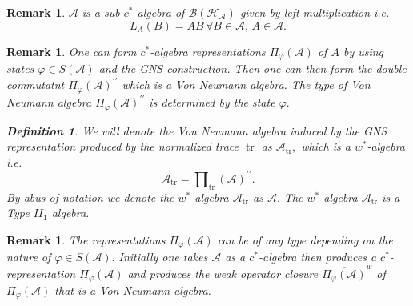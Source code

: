 \documentclass[aps,preprint]{revtex4}%
\newtheorem{definition}[theorem]{Definition}
\newtheorem{remark}[theorem]{Remark}
\begin{document}
\begin{remark}
$\mathcal{A}$ is a \emph{sub }$c^{\ast}$\emph{-algebra} of $\mathcal{B}\left(
\mathcal{H}_{\mathcal{A}}\right)  $ given by left multiplication i.e.
\begin{equation}
L_{A}\left(  B\right)  =AB\,\forall B\in\mathcal{A},\,A\in\mathcal{A}.
\end{equation}

\end{remark}

\begin{remark}
\emph{One can form }$c^{\ast}$\emph{-algebra representations }$\Pi_{\varphi
}\left(  \mathcal{A}\right)  $\emph{ of }$A$\emph{ by using states }%
$\varphi\in S\left(  \mathcal{A}\right)  $\emph{ and the GNS construction.
Then one can then form the double commutatnt }$\Pi_{\varphi}\left(
\mathcal{A}\right)  ^{\prime\prime}$\emph{ which is a Von Neumann algebra. The
type of Von Neumann algebra }$\Pi_{\varphi}\left(  \mathcal{A}\right)
^{\prime\prime}$\emph{ is determined by the state }$\varphi.$

\begin{definition}
We will denote the \emph{Von Neumann algebra induced by the }GNS
representation produced by the normalized trace $\operatorname*{tr}$ as
$\mathcal{A}_{\operatorname*{tr}},$ which is a $w^{\ast}$-algebra i.e.
\begin{equation}
\mathcal{A}_{\operatorname*{tr}}=%
{\textstyle\prod\nolimits_{\operatorname*{tr}}}
\left(  \mathcal{A}\right)  ^{\prime\prime}.
\end{equation}
By abus of notation we denote the $w^{\ast}$-algebra $\mathcal{A}%
_{\operatorname*{tr}}$ as $\mathcal{A}.$ The $w^{\ast}$-algebra $\mathcal{A}%
_{\operatorname*{tr}}$ is a Type $II_{1}$ algebra.
\end{definition}
\end{remark}

\begin{remark}
The representations $\Pi_{\varphi}\left(  \mathcal{A}\right)  $ can be of
\emph{any type} depending on the nature of $\varphi\in S\left(  \mathcal{A}%
\right)  .$ Initially one takes $\mathcal{A}$ as a $c^{\ast}$-algebra then
produces a $c^{\ast}$-representation $\Pi_{\varphi}\left(  \mathcal{A}\right)
$ and produces the weak operator closure $\overline{\Pi_{\varphi}\left(
\mathcal{A}\right)  }^{w}$ of $\Pi_{\varphi}\left(  \mathcal{A}\right)  $ that
is a Von Neumann algebra.
\end{remark}
\end{document}
